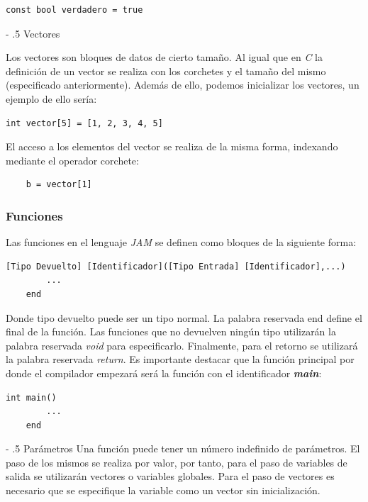 \documentclass[a4paper,10pt]{article}
\makeatletter
\renewcommand\paragraph{%
   \@startsection{paragraph}{4}{0mm}%
      {-\baselineskip}%
      {.5\baselineskip}%
      {\normalfont\normalsize\bfseries}}
\makeatother
\begin{document}
\begin{lstlisting}[language=jam]
	const bool verdadero = true
\end{lstlisting}


\paragraph{Vectores}

Los vectores son bloques de datos de cierto tamaño. Al igual que en\textit{ C} la definición de un vector se realiza con los corchetes y el tamaño del mismo (especificado anteriormente). Además de ello, podemos inicializar los vectores, un ejemplo de ello sería:

\begin{lstlisting}[language=jam]
	int vector[5] = [1, 2, 3, 4, 5]
\end{lstlisting}

\noindent El acceso a los elementos del vector se realiza de la misma forma, indexando mediante el operador corchete:
\begin{lstlisting}
	b = vector[1]
\end{lstlisting}

\subsubsection*{Funciones}

\noindent Las funciones en el lenguaje \textit{JAM} se definen como bloques de la siguiente forma:

\begin{lstlisting}[language=jam]
	[Tipo Devuelto] [Identificador]([Tipo Entrada] [Identificador],...)
		...
	end
\end{lstlisting}

Donde tipo devuelto puede ser un tipo normal. La palabra reservada end\textit{ }define el final de la función. Las funciones que no devuelven ningún tipo utilizarán la palabra reservada \textit{void} para especificarlo. Finalmente, para el retorno se utilizará la palabra reservada \emph{return}. Es importante destacar que la función principal por donde el compilador empezará será la función con el identificador \emph{\textbf{main}}:

\begin{lstlisting}[language=jam]
	int main()
		...
	end
\end{lstlisting}

\paragraph{Parámetros}
Una función puede tener un número indefinido de parámetros. El paso de los mismos se realiza por valor, por tanto, para el paso de variables de salida se utilizarán vectores o variables globales. Para el paso de vectores es necesario que se especifique la variable como un vector sin inicialización.
\end{document}
